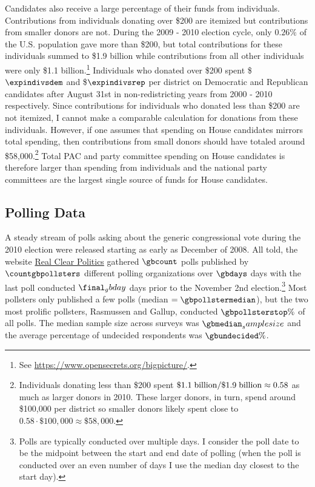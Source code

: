 \documentclass[12pt,final,fleqn]{article}
\theoremstyle{plain}
\begin{document}
Candidates also receive a large percentage of their funds from individuals. Contributions from individuals donating over \$200 are itemized but contributions from smaller donors are not. During the 2009 - 2010 election cycle, only $0.26\%$ of the U.S. population gave more than \$200, but total contributions for these individuals summed to \$1.9 billion while contributions from all other individuals were only \$1.1 billion.\footnote{See \url{https://www.opensecrets.org/bigpicture/}.} Individuals who donated over \$200 spent \$$\expindivsdem$ and \$$\expindivsrep$ per district on Democratic and Republican candidates after August 31st in non-redistricting years from 2000 - 2010 respectively. Since contributions for individuals who donated less than \$200 are not itemized, I cannot make a comparable calculation for donations from these individuals. However, if one assumes that spending on House candidates mirrors total spending, then contributions from small donors should have totaled around \$58,000.\footnote{Individuals donating less than \$200 spent $\$1.1\; \rm{billion}/\$1.9\; \rm{billion} \approx 0.58$ as much as larger donors in 2010. These larger donors, in turn, spend around \$100,000 per district so smaller donors likely spent close to $0.58 \cdot \$100,000 \approx \$58,000$.} Total PAC and party committee spending on House candidates is therefore larger than spending from individuals and the national party committees are the largest single source of funds for House candidates.

\subsection{Polling Data}
A steady stream of polls asking about the generic congressional vote during the 2010 election were released starting as early as December of 2008. All told, the website \href{http://www.realclearpolitics.com/}{Real Clear Politics} gathered  $\gbcount$ polls published by $\countgbpollsters$ different polling organizations over $\gbdays$ days with the last poll conducted $\final_gbday$ days prior to the November 2nd election.\footnote{Polls are typically conducted over multiple days. I consider the poll date to be the midpoint between the start and end date of polling (when the poll is conducted over an even number of days I use the median day closest to the start day).} Most pollsters only published a few polls (median $= \gbpollstermedian$), but the two most prolific pollsters,  Rasmussen and Gallup, conducted $\gbpollsterstop\%$ of all polls. The median sample size across surveys was $\gbmedian_samplesize$ and the average percentage of undecided respondents was $\gbundecided\%$.
\end{document}
